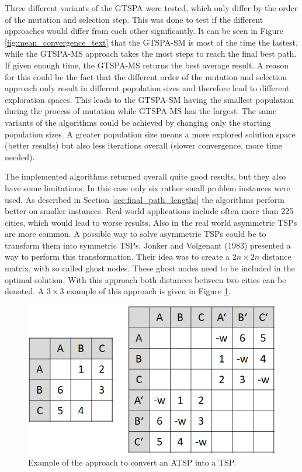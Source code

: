 \documentclass[12pt]{article}
\theoremstyle{plain}
\theoremstyle{definition}
\theoremstyle{remark}
\begin{document}
Three different variants of the GTSPA were tested, which only differ by the order of the mutation and selection step.
This was done to test if the different approaches would differ from each other significantly.
It can be seen in Figure \ref{fig:mean_convergence_text} that the GTSPA-SM is most of the time the fastest, while the GTSPA-MS approach takes the most steps to reach the final best path.
If given enough time, the GTSPA-MS returns the best average result.
A reason for this could be the fact that the different order of the mutation and selection approach only result in different population sizes and therefore lead to different exploration spaces.
This leads to the GTSPA-SM having the smallest population during the process of mutation while GTSPA-MS has the largest.
The same variants of the algorithms could be achieved by changing only the starting population sizes.
A greater population size means a more explored solution space (better results) but also less iterations overall (slower convergence, more time needed).

The implemented algorithms returned overall quite good results, but they also have some limitations.
In this case only six rather small problem instances were used.
As described in Section \ref{sec:final_path_lengths} the algorithms perform better on smaller instances.
Real world applications include often more than 225 cities, which would lead to worse results.
Also in the real world asymmetric TSPs are more common.
A possible way to solve asymmetric TSPs could be to transform them into symmetric TSPs.
Jonker and Volgenant (1983) presented a way to perform this transformation\cite{ATSP1}.
Their idea was to create a $2n \times 2n$ distance matrix, with so called ghost nodes.
These ghost nodes need to be included in the optimal solution.
With this approach both distances between two cities can be denoted.
A $3 \times 3$ example of this approach is given in Figure \ref{fig:ATSP_example}.

\begin{figure}[ht]
    \centering
    \includegraphics[scale = 0.4]{ATSP}
    \caption{Example of the approach to convert an ATSP into a TSP.}
    \label{fig:ATSP_example}
\end{figure}
\end{document}
